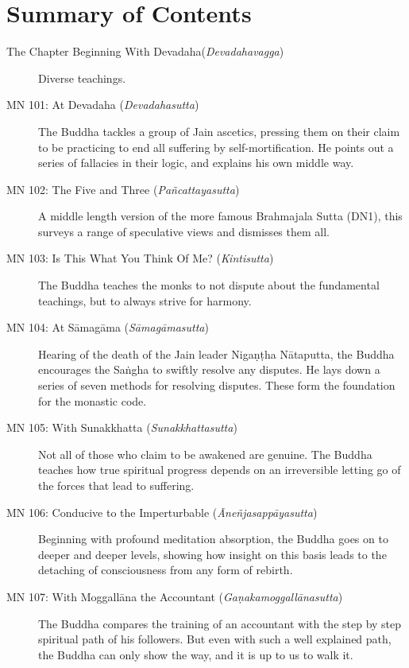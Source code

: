 \documentclass[12pt,openany]{book}%
\begin{document}
\newpage

\setlength{\parindent}{1.5em}%
\tableofcontents
\newpage
\pagestyle{fancy}
%
\chapter*{Summary of Contents}

\begin{description}%
\item[The Chapter Beginning With Devadaha(\textit{\textsanskrit{Devadahavagga}})] Diverse teachings.%
\item[MN 101: At Devadaha (\textit{\textsanskrit{Devadahasutta}})] The Buddha tackles a group of Jain ascetics, pressing them on their claim to be practicing to end all suffering by self-mortification. He points out a series of fallacies in their logic, and explains his own middle way.%
\item[MN 102: The Five and Three (\textit{\textsanskrit{Pañcattayasutta}})] A middle length version of the more famous Brahmajala Sutta (DN1), this surveys a range of speculative views and dismisses them all.%
\item[MN 103: Is This What You Think Of Me? (\textit{\textsanskrit{Kintisutta}})] The Buddha teaches the monks to not dispute about the fundamental teachings, but to always strive for harmony.%
\item[MN 104: At \textsanskrit{Sāmagāma} (\textit{\textsanskrit{Sāmagāmasutta}})] Hearing of the death of the Jain leader \textsanskrit{Nigaṇṭha} \textsanskrit{Nātaputta}, the Buddha encourages the \textsanskrit{Saṅgha} to swiftly resolve any disputes. He lays down a series of seven methods for resolving disputes. These form the foundation for the monastic code.%
\item[MN 105: With Sunakkhatta (\textit{\textsanskrit{Sunakkhattasutta}})] Not all of those who claim to be awakened are genuine. The Buddha teaches how true spiritual progress depends on an irreversible letting go of the forces that lead to suffering.%
\item[MN 106: Conducive to the Imperturbable (\textit{\textsanskrit{Āneñjasappāyasutta}})] Beginning with profound meditation absorption, the Buddha goes on to deeper and deeper levels, showing how insight on this basis leads to the detaching of consciousness from any form of rebirth.%
\item[MN 107: With \textsanskrit{Moggallāna} the Accountant (\textit{\textsanskrit{Gaṇakamoggallānasutta}})] The Buddha compares the training of an accountant with the step by step spiritual path of his followers. But even with such a well explained path, the Buddha can only show the way, and it is up to us to walk it.%

\end{description}
\end{document}
